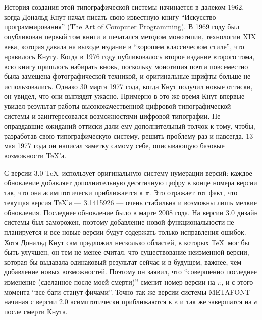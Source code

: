 История создания этой типографической системы начинается в далеком 1962, когда Дональд Кнут начал писать свою известную книгу ``Искусство программирования'' (The Art of Computer Programming). В 1969 году был опубликован первый том книги и печатался методом монотипии, технологии XIX века, которая давала на выходе издание в ``хорошем классическом стиле'', что нравилось Кнуту. Когда в 1976 году публиковалось второе издание второго тома, всю книгу пришлось набирать вновь, поскольку монотипия почти повсеместно была замещена фотографической техникой, и оригинальные шрифты больше не использовались. Однако 30 марта 1977 года, когда Кнут получил новые оттиски, он увидел, что они выглядят ужасно. Примерно в это же время Кнут впервые увидел результат работы высококачественной цифровой типографической системы и заинтересовался возможностями цифровой типографии. Не оправдавшие ожиданий оттиски дали ему дополнительный толчок к тому, чтобы, разработав свою типографическую систему, решить проблему раз и навсегда. 13 мая 1977 года он написал заметку самому себе, описывающую базовые возможности \TeX’а.

С версии 3.0 \TeX~использует оригинальную систему нумерации версий: каждое обновление добавляет дополнительную десятичную цифру в конце номера версии так, что она асимптотически приближается к $\pi$. Это отражает тот факт, что текущая версия \TeX’а --- 3.1415926 --- очень стабильна и возможны лишь мелкие обновления. Последнее обновление было в марте 2008 года. На версии 3.0 дизайн системы был заморожен, поэтому добавление новой функциональности не планируется и все новые версии будут содержать только исправления ошибок. Хотя Дональд Кнут сам предложил несколько областей, в которых \TeX~мог бы быть улучшен, он тем не менее считал, что существование неизменной версии, которая бы выдавала одинаковый результат сейчас и в будущем, важнее, чем добавление новых возможностей. Поэтому он заявил, что ``совершенно последнее изменение (сделанное после моей смерти)'' сменит номер версии на $\pi$, и с этого момента ``все баги станут фичами''. Точно так же версии системы METAFONT начиная с версии 2.0 асимптотически приближаются к $e$ и так же завершатся на $e$ после смерти Кнута.


